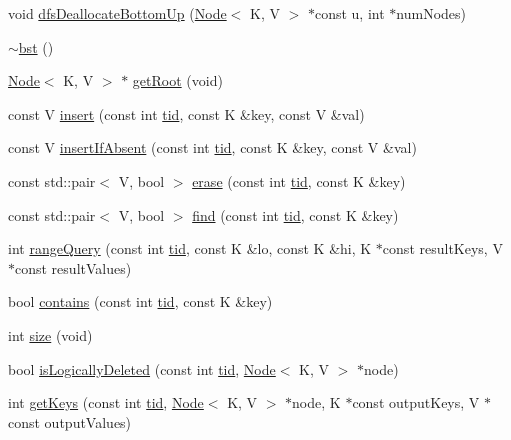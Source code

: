 \begin{DoxyCompactItemize}
\item 
void \hyperlink{classbst__ns_1_1bst_a9f5db4d1669ab7e4c45c3f0e56a1794e}{dfs\+Deallocate\+Bottom\+Up} (\hyperlink{classbst__ns_1_1Node}{Node}$<$ K, V $>$ $\ast$const u, int $\ast$num\+Nodes)
\item 
\hyperlink{classbst__ns_1_1bst_a4c894013d0092212d3f2bc2fb7eb8fb6}{$\sim$bst} ()
\item 
\hyperlink{classbst__ns_1_1Node}{Node}$<$ K, V $>$ $\ast$ \hyperlink{classbst__ns_1_1bst_a267da827db6252aec7a3f120bfad7c85}{get\+Root} (void)
\item 
const V \hyperlink{classbst__ns_1_1bst_a6cd6bfaae7e6100322415e420a06d546}{insert} (const int \hyperlink{microbench_2main_8cpp_a9ca9869868fe7e7a38a921cc7de4103f}{tid}, const K \&key, const V \&val)
\item 
const V \hyperlink{classbst__ns_1_1bst_a63851e4152896a4d00f6db93a9527299}{insert\+If\+Absent} (const int \hyperlink{microbench_2main_8cpp_a9ca9869868fe7e7a38a921cc7de4103f}{tid}, const K \&key, const V \&val)
\item 
const std\+::pair$<$ V, bool $>$ \hyperlink{classbst__ns_1_1bst_aba4ffb8755d802c9ae92c40a275559ac}{erase} (const int \hyperlink{microbench_2main_8cpp_a9ca9869868fe7e7a38a921cc7de4103f}{tid}, const K \&key)
\item 
const std\+::pair$<$ V, bool $>$ \hyperlink{classbst__ns_1_1bst_afbc48b466220d2de3bdb6ac29877ecb1}{find} (const int \hyperlink{microbench_2main_8cpp_a9ca9869868fe7e7a38a921cc7de4103f}{tid}, const K \&key)
\item 
int \hyperlink{classbst__ns_1_1bst_aac59710c399b54c5a23cc2ae38688bb4}{range\+Query} (const int \hyperlink{microbench_2main_8cpp_a9ca9869868fe7e7a38a921cc7de4103f}{tid}, const K \&lo, const K \&hi, K $\ast$const result\+Keys, V $\ast$const result\+Values)
\item 
bool \hyperlink{classbst__ns_1_1bst_a794752307f06c0cdaa56dd7e30028bfa}{contains} (const int \hyperlink{microbench_2main_8cpp_a9ca9869868fe7e7a38a921cc7de4103f}{tid}, const K \&key)
\item 
int \hyperlink{classbst__ns_1_1bst_af6d6b7918b5f4417a7462d712b5c4695}{size} (void)
\item 
bool \hyperlink{classbst__ns_1_1bst_a6e04d71942c2db3ce039a65ac020f8af}{is\+Logically\+Deleted} (const int \hyperlink{microbench_2main_8cpp_a9ca9869868fe7e7a38a921cc7de4103f}{tid}, \hyperlink{classbst__ns_1_1Node}{Node}$<$ K, V $>$ $\ast$node)
\item 
int \hyperlink{classbst__ns_1_1bst_a51d37738bc278d1b640c96380bad9be9}{get\+Keys} (const int \hyperlink{microbench_2main_8cpp_a9ca9869868fe7e7a38a921cc7de4103f}{tid}, \hyperlink{classbst__ns_1_1Node}{Node}$<$ K, V $>$ $\ast$node, K $\ast$const output\+Keys, V $\ast$const output\+Values)

\end{DoxyCompactItemize}
